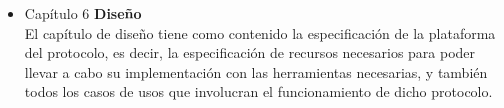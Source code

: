 \begin{itemize}
	\item Capítulo 6 \textbf{Diseño} \\
	El capítulo de diseño tiene como contenido la especificación de la plataforma del protocolo, es decir, la especificación de recursos necesarios para poder llevar a cabo su implementación con las herramientas necesarias, y también todos los casos de usos que involucran el funcionamiento de dicho protocolo.

\end{itemize}




    